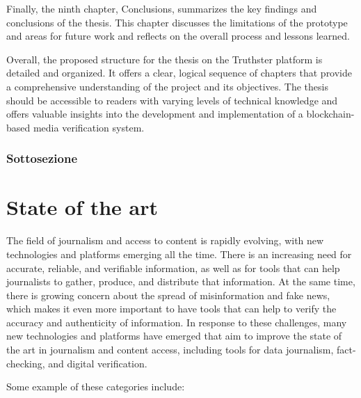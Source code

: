 \documentclass[target=mst,aauheader=]{thud}
\begin{document}
Finally, the ninth chapter, Conclusions, summarizes the key findings and conclusions of the thesis. This chapter discusses the limitations of the prototype and areas for future work and reflects on the overall process and lessons learned.\par
Overall, the proposed structure for the thesis on the Truthster platform is detailed and organized. It offers a clear, logical sequence of chapters that provide a comprehensive understanding of the project and its objectives. The thesis should be accessible to readers with varying levels of technical knowledge and offers valuable insights into the development and implementation of a blockchain-based media verification system.

\subsection{Sottosezione}





\chapter{State of the art}
\label{stateOfTheArt}

The field of journalism and access to content is rapidly evolving, with new technologies and platforms emerging all the time. There is an increasing need for accurate, reliable, and verifiable information, as well as for tools that can help journalists to gather, produce, and distribute that information. At the same time, there is growing concern about the spread of misinformation and fake news\cite{DefiningFakeNews}, which makes it even more important to have tools that can help to verify the accuracy and authenticity of information. In response to these challenges, many new technologies and platforms have emerged that aim to improve the state of the art in journalism and content access, including tools for data journalism, fact-checking, and digital verification.\par
Some example of these categories include:
\end{document}
